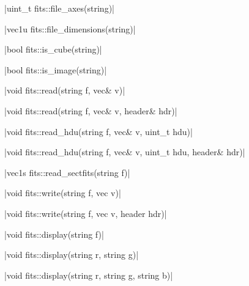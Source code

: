 \funcitem \cppinline|uint_t fits::file_axes(string)| 

\funcitem \cppinline|vec1u fits::file_dimensions(string)| 

\funcitem \cppinline|bool fits::is_cube(string)| 

\funcitem \cppinline|bool fits::is_image(string)| 

\funcitem \cppinline|void fits::read(string f, vec& v)| 

\cppinline|void fits::read(string f, vec& v, header& hdr)|

\cppinline|void fits::read_hdu(string f, vec& v, uint_t hdu)| 

\cppinline|void fits::read_hdu(string f, vec& v, uint_t hdu, header& hdr)|

\funcitem \cppinline|vec1s fits::read_sectfits(string f)| 

\funcitem \cppinline|void fits::write(string f, vec v)| 

\cppinline|void fits::write(string f, vec v, header hdr)|

\funcitem \cppinline|void fits::display(string f)| 

\cppinline|void fits::display(string r, string g)|

\cppinline|void fits::display(string r, string g, string b)|
